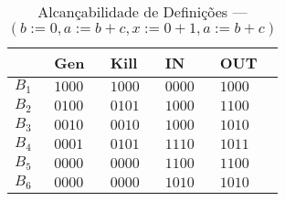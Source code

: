 \begin{table}[ht]
\centering
\begin{tabular}{l|l|l|l|l}
	& Gen & Kill & IN & OUT\\
\hline
$B_{1}$ &  $1000$ & $1000$ & $0000$ & $1000$\\
$B_{2}$ &  $0100$ & $0101$ & $1000$ & $1100$\\
$B_{3}$ &  $0010$ & $0010$ & $1000$ & $1010$\\
$B_{4}$ &  $0001$ & $0101$ & $1110$ & $1011$\\
$B_{5}$ &  $0000$ & $0000$ & $1100$ & $1100$\\
$B_{6}$ &  $0000$ & $0000$ & $1010$ & $1010$\\
\end{tabular}
\caption{Alcan\c{c}abilidade de Defini\c{c}\~oes --- $(b:=0, a:=b+c, x:=0+1, a:=b+c)$}
\end{table}

